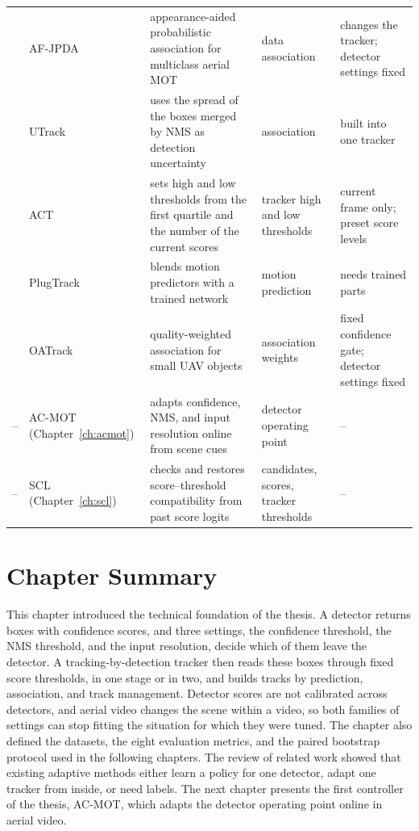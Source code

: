 \begin{table}[tbp]
\begin{tabular}{>{\raggedright\arraybackslash}p{0.9cm}>{\raggedright\arraybackslash}p{2.5cm}>{\raggedright\arraybackslash}p{3.8cm}>{\raggedright\arraybackslash}p{2.2cm}>{\raggedright\arraybackslash}p{3.3cm}}
2024 & AF-JPDA \cite{kim2024afjpda} & appearance-aided probabilistic association for multiclass aerial MOT & data association & changes the tracker; detector settings fixed \\
2025 & UTrack \cite{solano2025utrack} & uses the spread of the boxes merged by NMS as detection uncertainty & association & built into one tracker \\
2026 & ACT \cite{act2026adaptive} & sets high and low thresholds from the first quartile and the number of the current scores & tracker high and low thresholds & current frame only; preset score levels \\
2026 & PlugTrack \cite{kim2026plugtrack} & blends motion predictors with a trained network & motion prediction & needs trained parts \\
2026 & OATrack \cite{qi2026oatrack} & quality-weighted association for small UAV objects & association weights & fixed confidence gate; detector settings fixed \\
\midrule
-- & AC-MOT (Chapter~\ref{ch:acmot}) & adapts confidence, NMS, and input resolution online from scene cues & detector operating point & -- \\
-- & SCL (Chapter~\ref{ch:scl}) & checks and restores score--threshold compatibility from past score logits & candidates, scores, tracker thresholds & -- \\
\bottomrule
\end{tabular}
\end{table}

\section{Chapter Summary}\label{sec:bg-summary}
This chapter introduced the technical foundation of the thesis. A detector returns boxes with confidence scores, and three settings, the confidence threshold, the NMS threshold, and the input resolution, decide which of them leave the detector. A tracking-by-detection tracker then reads these boxes through fixed score thresholds, in one stage or in two, and builds tracks by prediction, association, and track management. Detector scores are not calibrated across detectors, and aerial video changes the scene within a video, so both families of settings can stop fitting the situation for which they were tuned. The chapter also defined the datasets, the eight evaluation metrics, and the paired bootstrap protocol used in the following chapters. The review of related work showed that existing adaptive methods either learn a policy for one detector, adapt one tracker from inside, or need labels. The next chapter presents the first controller of the thesis, AC-MOT, which adapts the detector operating point online in aerial video.
